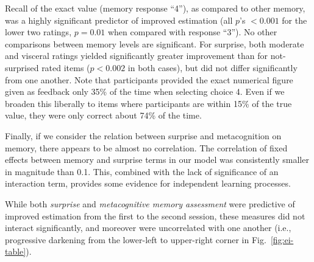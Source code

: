 Recall of the exact value (memory response ``4''), as compared to other memory, was
a highly significant predictor of improved estimation (all $p$'s $< 0.001$ for the
lower two ratings, $p = 0.01$ when compared with response ``3''). No other
comparisons between memory levels are significant. For surprise, both moderate
and visceral ratings yielded significantly greater improvement than for
not-surprised rated items ($p < 0.002$ in both cases), but did not differ
significantly from one another. Note that participants provided the exact
numerical figure given as feedback only 35\% of the time when selecting choice
4. Even if we broaden this liberally to items where participants are within 15\%
of the true value, they were only correct about 74\% of the time.

Finally, if we consider the relation between surprise and metacognition on
memory, there appears to be almost no correlation. The correlation of fixed
effects between memory and surprise terms in our model was consistently smaller
in magnitude than 0.1. This, combined with the lack of significance of an
interaction term, provides some evidence for independent learning processes.

While both \emph{surprise} and \emph{metacognitive memory assessment} were
predictive of improved estimation from the first to the second session, these
measures did not interact significantly, and moreover were uncorrelated with one
another (i.e., progressive darkening from the lower-left to upper-right corner
in Fig.~\ref{fig:ei-table}). 





